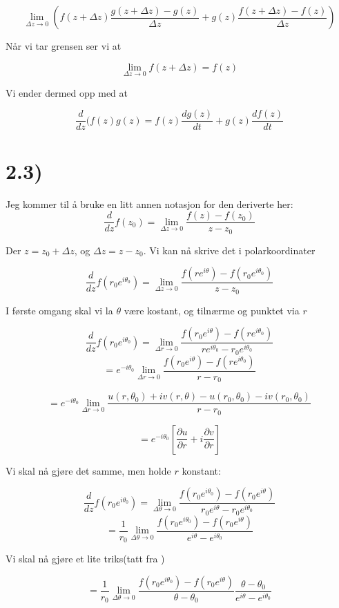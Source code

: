\documentclass[a4paper,norsk, 10pt]{article}
\begin{document}
$$
\lim_{\Delta z \rightarrow 0} \left( f(z+\Delta z) \frac{g(z+\Delta z) - g(z)}{\Delta z} + g(z) \frac{f(z+\Delta z) - f(z)}{\Delta z}\right)
$$

Når vi tar grensen ser vi at

$$
\lim_{\Delta z \rightarrow 0}  f(z+\Delta z) = f(z)
$$

Vi ender dermed opp med at

$$
\frac{d}{dz}(f(z)g(z) = f(z) \frac{dg(z)}{dt} + g(z) \frac{df(z)}{dt}
$$

\section*{2.3)}

Jeg kommer til å bruke en litt annen notasjon for den deriverte her:
$$
\frac{d}{dz} f(z_0) = \lim_{\Delta z \rightarrow 0} \frac{f(z) - f(z_0)}{z-z_0}
$$

Der $z = z_0 + \Delta z$, og $\Delta z = z -z_0$. Vi kan nå skrive det i polarkoordinater


$$
\frac{d}{dz} f(r_0e^{i\theta_0}) = \lim_{\Delta z \rightarrow 0} \frac{f(re^{i\theta}) - f(r_0e^{i\theta_0})}{z-z_0}
$$

I første omgang skal vi la $\theta$ være kostant, og tilnærme og punktet via $r$

$$
\frac{d}{dz} f(r_0e^{i\theta_0}) = \lim_{\Delta r \rightarrow 0} \frac{f(r_0e^{i\theta})-f(re^{i\theta_0})}{re^{i\theta_0}-r_0e^{i\theta_0}}
$$
$$
= e^{-i\theta_0} \lim_{\Delta r \rightarrow 0} \frac{f(r_0e^{i\theta})-f(re^{i\theta_0})}{r-r_0}
$$

$$
= e^{-i\theta_0} \lim_{\Delta r \rightarrow 0} \frac{u(r,\theta_0) + iv(r,\theta) - u(r_0,\theta_0) - iv(r_0,\theta_0)}{r-r_0}
$$

$$
= e^{-i\theta_0} \left[\frac{\partial u}{\partial r} + i\frac{\partial v}{\partial r}\right]
$$

Vi skal nå gjøre det samme, men holde $r$ konstant:

$$
\frac{d}{dz} f(r_0e^{i\theta_0}) = \lim_{\Delta \theta \rightarrow 0} \frac{f(r_0e^{i\theta_0})-f(r_0e^{i\theta})}{r_0e^{i\theta}-r_0e^{i\theta_0}}
$$
$$
= \frac{1}{r_0} \lim_{\Delta \theta \rightarrow 0} \frac{f(r_0e^{i\theta_0})-f(r_0e^{i\theta})}{e^{i\theta}-e^{i\theta_0}}
$$

Vi skal nå gjøre et lite triks(tatt fra \cite{triks})

$$
= \frac{1}{r_0} \lim_{\Delta \theta \rightarrow 0} \frac{f(r_0e^{i\theta_0})-f(r_0e^{i\theta})}{\theta - \theta_0}\frac{\theta - \theta_0}{e^{i\theta}-e^{i\theta_0}}
$$
\end{document}

